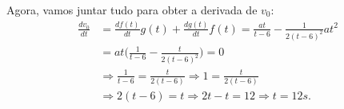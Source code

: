 \documentclass[physics_notes.tex]{subfiles}
\begin{document}
Agora, vamos juntar tudo para obter a derivada de $v_{0}$:
\begin{align*}
	\frac{dv_{0}}{dt} & = \frac{df(t)}{dt}g(t) + \frac{dg(t)}{dt}f(t) = \frac{at}{t-6} - \frac{1}{2(t-6)^{2}}at^{2} \\
	                  & = at\biggl(\frac{1}{t-6} - \frac{t}{2(t-6)^{2}}\biggr) = 0                                  \\
	                  & \Rightarrow \frac{1}{t-6} = \frac{t}{2(t-6)} \Rightarrow 1 = \frac{t}{2(t-6)}               \\
	                  & \Rightarrow 2(t-6) = t \Rightarrow 2t - t = 12 \Rightarrow t = 12s.
\end{align*}
\end{document}
